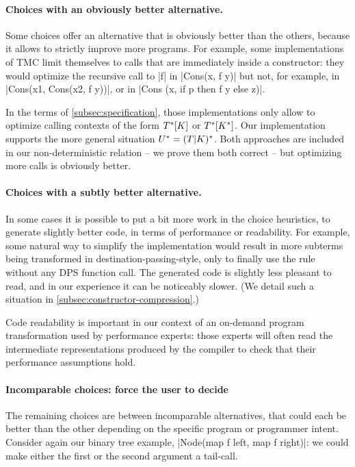 \paragraph{Choices with an obviously better alternative.}
Some choices offer an alternative that is obviously better than the others, because it allows to strictly improve more programs. For example, some implementations of TMC limit themselves to calls that are immediately inside a constructor: they would optimize the recursive call to \ocaml|f| in \ocaml|Cons(x, f y)| but not, for example, in \ocaml|Cons(x1, Cons(x2, f y))|, or in \ocaml|Cons (x, if p then f y else z)|.

In the terms of \cref{subsec:specification}, those implementations only allow to optimize calling contexts of the form $\datalangTailCtx{[\datalangConsFrame]}$ or $\datalangTailCtx{[\datalangConsCtx]}$. Our implementation supports the more general situation $\datalangTMCCtx = (\datalangTailFrame | \datalangConsFrame)^{*}$. Both approaches are included in our non-deterministic relation -- we prove them both correct -- but optimizing more calls is obviously better.

\paragraph{Choices with a subtly better alternative.} In some cases it
is possible to put a bit more work in the choice heuristics, to
generate slightly better code, in terms of performance or
readability. For example, some natural way to simplify the
implementation would result in more subterms being transformed in
destination-passing-style, only to finally use the
 rule without any DPS function call. The generated
code is slightly less pleasant to read, and in our experience it can
be noticeably slower. (We detail such a situation in \cref{subsec:constructor-compression}.)

Code readability is important in our context of an on-demand program
transformation used by performance experts: those experts will often
read the intermediate representations produced by the compiler to
check that their performance assumptions hold.

\paragraph{Incomparable choices: force the user to decide} \label{subsec:user-control}
The remaining choices are between incomparable alternatives, that could
each be better than the other depending on the specific program or
programmer intent. Consider again our binary tree example,
\ocaml|Node(map f left, map f right)|: we could make either the first
or the second argument a tail-call.

